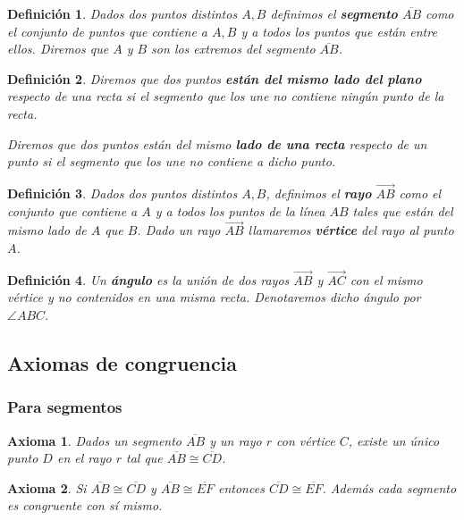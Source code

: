 \documentclass[12pt, spanish]{article}
\newtheorem*{defin}{Definición}
\def\theaxsection{}
\newcommand{\setaxsection}[1]{\def\theaxsection{#1}\setcounter{ax}{0}}
\theoremstyle{axstyle}
\newtheorem{ax}{Axioma}
\theoremstyle{axbstyle}
\begin{document}
\begin{defin}
  Dados dos puntos distintos $A, B$ definimos el \textbf{segmento}
  $\overline{AB}$ como el conjunto de puntos que contiene a $A, B$ y a todos los
  puntos que están entre ellos. Diremos que $A$ y $B$ son los extremos del
  segmento $\overline{AB}$.
\end{defin}

\begin{defin}
  Diremos que dos puntos \textbf{están del mismo lado del plano} respecto de una
  recta si el segmento que los une no contiene ningún punto de la recta.

  Diremos que dos puntos están del mismo \textbf{lado de una recta} respecto de
  un punto si el segmento que los une no contiene a dicho punto.
\end{defin}

\begin{defin}
  Dados dos puntos distintos $A, B$, definimos el \textbf{rayo}
  $\overrightarrow{AB}$ como el conjunto que contiene a $A$ y a todos los puntos
  de la línea $AB$ tales que están del mismo lado de $A$ que $B$. Dado un rayo
  $\overrightarrow{AB}$ llamaremos \textbf{vértice} del rayo al punto $A$.
\end{defin}

\begin{defin}
  Un \textbf{ángulo} es la unión de dos rayos $\overrightarrow{AB}$ y
  $\overrightarrow{AC}$ con el mismo vértice y no contenidos en una misma recta.
  Denotaremos dicho ángulo por $\angle ABC$.
\end{defin}

\subsection{Axiomas de congruencia}
\subsubsection{Para segmentos}
\setaxsection{C}

\begin{ax}\label{C1}
  Dados un segmento $\overline{AB}$ y un rayo $r$ con vértice $C$, existe un
  único punto $D$ en el rayo $r$ tal que $\overline{AB}\cong\overline{CD}$.
\end{ax}

\begin{ax}\label{C2}
  Si $\overline{AB}\cong\overline{CD}$ y $\overline{AB}\cong\overline{EF}$
  entonces $\overline{CD}\cong\overline{EF}$. Además cada segmento es congruente
  con sí mismo.
\end{ax}
\end{document}
